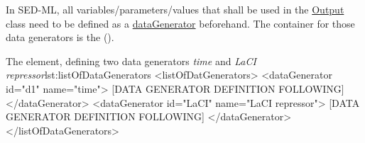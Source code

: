 \label{sec:listOfDataGenerators}

In SED-ML, all variables/parameters/values that shall be used in the \hyperref[class:output]{Output} class need to be defined as a \hyperref[class:dataGenerator]{dataGenerator} beforehand. The container for those data generators is the  (). 
%

%
\begin{myXmlLst}{The  element, defining two data generators \emph{time} and \emph{LaCI repressor}}{lst:listOfDataGenerators}
<listOfDatGenerators>
 <dataGenerator id="d1" name="time">
  [DATA GENERATOR DEFINITION FOLLOWING]
 </dataGenerator>
 <dataGenerator id="LaCI" name="LaCI repressor">
  [DATA GENERATOR DEFINITION FOLLOWING]
 </dataGenerator>
</listOfDataGenerators>
\end{myXmlLst}
%



